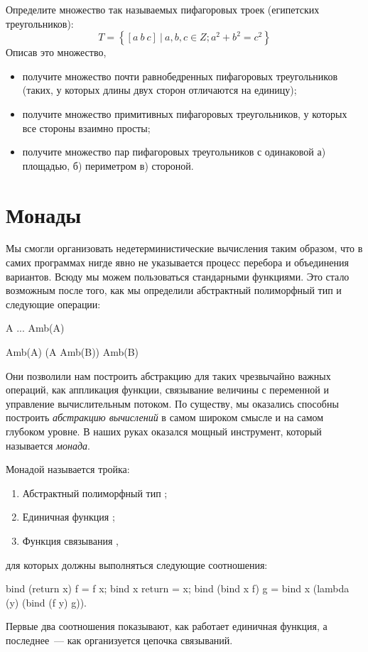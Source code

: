 \begin{Assignment}
Определите множество так называемых пифагоровых троек (египетских треугольников):
$$T = \left\{ [a~b~c]~|~a,b,c \in Z; a^2 + b^2 = c^2 \right\}$$
Описав это множество,
\begin{itemize}
  \item получите множество почти равнобедренных пифагоровых треугольников (таких, у которых длины двух сторон отличаются на единицу);
  \item получите множество примитивных пифагоровых треугольников, у которых все стороны взаимно просты;
  \item получите множество пар пифагоровых треугольников с одинаковой а) площадью, б) периметром в) стороной.
\end{itemize}
\end{Assignment}

\section[2]{Монады}%
Мы смогли организовать недетерминистические вычисления таким образом, что в самих  программах нигде явно не указывается процесс перебора и объединения вариантов. Всюду мы можем пользоваться стандарными функциями. Это стало возможным после того, как мы определили абстрактный полиморфный тип  и следующие операции:

\newpage
\begin{type}
   A ... \arrow Amb(A)
  \item {} Amb(A) (A \arrow Amb(B)) \arrow Amb(B)
\end{type}
 
Они позволили нам построить абстракцию для таких чрезвычайно важных операций, как  аппликация функции, связывание величины с переменной и управление вычислительным потоком. По существу, мы оказались способны построить \emph{абстракцию вычислений} в самом широком смысле и на самом глубоком уровне. В наших руках оказался мощный инструмент, который называется \emph{монада}. 

Монадой называется тройка:
\begin{enumerate}
  \item Абстрактный полиморфный тип ;
  \item Единичная функция ;
  \item Функция связывания ,
\end{enumerate}
для которых должны выполняться следующие соотношения:
\begin{SchemeCode}
  bind (return x) f = f x;
  bind x return = x;
  bind (bind x f) g = bind x (lambda (y) (bind (f y) g)).
\end{SchemeCode}
Первые два соотношения показывают, как работает единичная функция, а последнее~--- как организуется цепочка связываний.

